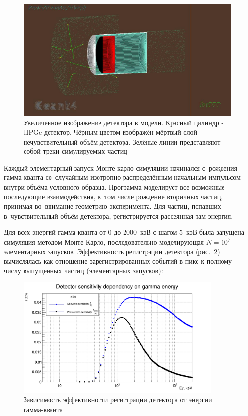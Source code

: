 \documentclass[a4paper,article,14pt]{extarticle}
\begin{document}
\begin{figure}[h!]
    \centering
    \includegraphics[width = 0.85 \textwidth]{images/Tracks.jpg}
    \caption{Увеличенное изображение детектора в модели. Красный цилиндр - HPGe-детектор. Чёрным цветом изображён мёртвый слой - нечувствительный объём детектора. Зелёные линии представляют собой треки симулируемых частиц}
    \label{tracks}
\end{figure}

Каждый элементарный запуск Монте-карло симуляции начинался с~рождения гамма-кванта со~случайным изотропно распределённым начальным импульсом внутри объёма условного образца.
Программа моделирует все возможные последующие взаимодействия, в~том числе рождение вторичных частиц, принимая во~внимание геометрию эксперимента.
Для частиц, попавших в~чувствительный объём детектора, регистрируется рассеянная там энергия.

Для всех энергий гамма-кванта от $0$ до $2000$~кэВ с шагом $5$~кэВ была запущена симуляция методом Монте-Карло, последовательно моделирующая $N = 10^7$ элементарных запусков.
Эффективность регистрации детектора (рис.~\ref{Ey}) вычислялась как отношение зарегистрированных событий в пике к полному числу выпущенных частиц (элементарных запусков):
\begin{figure}[t]
    \centering
    \includegraphics[width = 0.9\textwidth]{images/DetSens.png}
    \caption{Зависимость эффективности регистрации детектора от энергии гамма-кванта}\label{Ey}
\end{figure}
\end{document}
